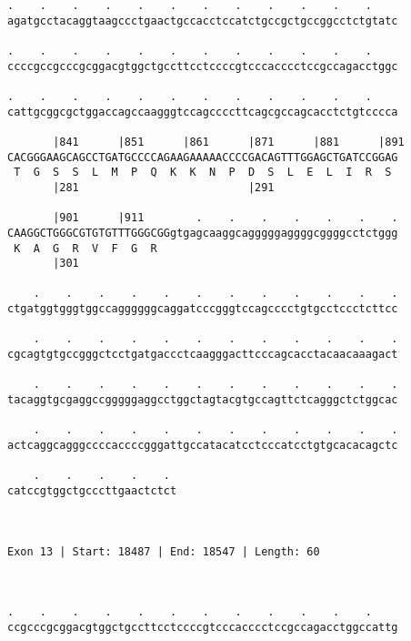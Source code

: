 \documentclass{article}
\begin{document}
\begin{Verbatim}
.    .    .    .    .    .    .    .    .    .    .    .    
agatgcctacaggtaagccctgaactgccacctccatctgccgctgccggcctctgtatc
                                                            
.    .    .    .    .    .    .    .    .    .    .    .    
ccccgccgcccgcggacgtggctgccttcctccccgtcccacccctccgccagacctggc
                                                            
.    .    .    .    .    .    .    .    .    .    .    .    
cattgcggcgctggaccagccaagggtccagccccttcagcgccagcacctctgtcccca
                                                            
       |841      |851      |861      |871      |881      |891
CACGGGAAGCAGCCTGATGCCCCAGAAGAAAAACCCCGACAGTTTGGAGCTGATCCGGAG
 T  G  S  S  L  M  P  Q  K  K  N  P  D  S  L  E  L  I  R  S 
       |281                          |291                   
  
       |901      |911        .    .    .    .    .    .    .
CAAGGCTGGGCGTGTGTTTGGGCGGgtgagcaaggcagggggaggggcggggcctctggg
 K  A  G  R  V  F  G  R                                     
       |301                                                 
  
    .    .    .    .    .    .    .    .    .    .    .    .
ctgatggtgggtggccaggggggcaggatcccgggtccagcccctgtgcctccctcttcc
                                                            
    .    .    .    .    .    .    .    .    .    .    .    .
cgcagtgtgccgggctcctgatgaccctcaagggacttcccagcacctacaacaaagact
                                                            
    .    .    .    .    .    .    .    .    .    .    .    .
tacaggtgcgaggccgggggaggcctggctagtacgtgccagttctcagggctctggcac
                                                            
    .    .    .    .    .    .    .    .    .    .    .    .
actcaggcagggccccaccccgggattgccatacatcctcccatcctgtgcacacagctc
                                                            
    .    .    .    .    . 
catccgtggctgcccttgaactctct
                          
                          
 
Exon 13 | Start: 18487 | End: 18547 | Length: 60



.    .    .    .    .    .    .    .    .    .    .    .    
ccgcccgcggacgtggctgccttcctccccgtcccacccctccgccagacctggccattg
                                                            

\end{Verbatim}
\end{document}
